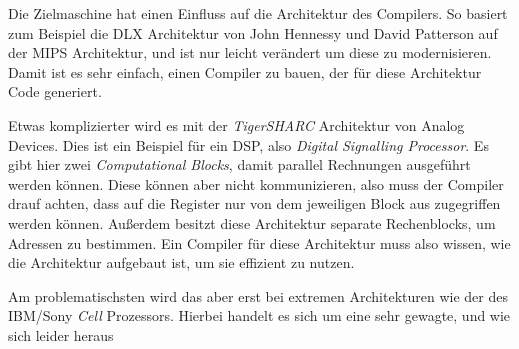 \documentclass[ngerman]{scrartcl}
\begin{document}
Die Zielmaschine hat einen Einfluss auf die Architektur des Compilers. So basiert zum Beispiel die DLX Architektur von John Hennessy und David Patterson auf der MIPS Architektur, und ist nur leicht verändert um diese zu modernisieren. Damit ist es sehr einfach, einen Compiler zu bauen, der für diese Architektur Code generiert.

Etwas komplizierter wird es mit der \emph{TigerSHARC} Architektur von Analog Devices. Dies ist ein Beispiel für ein DSP, also \emph{Digital Signalling Processor}. Es gibt hier zwei \emph{Computational Blocks}, damit parallel Rechnungen ausgeführt werden können. Diese können aber nicht kommunizieren, also muss der Compiler drauf achten, dass auf die Register nur von dem jeweiligen Block aus zugegriffen werden können. Außerdem besitzt diese Architektur separate Rechenblocks, um Adressen zu bestimmen. Ein Compiler für diese Architektur muss also wissen, wie die Architektur aufgebaut ist, um sie effizient zu nutzen.

Am problematischsten wird das aber erst bei extremen Architekturen wie der des IBM/Sony \emph{Cell} Prozessors. Hierbei handelt es sich um eine sehr gewagte, und wie sich leider heraus
\end{document}
